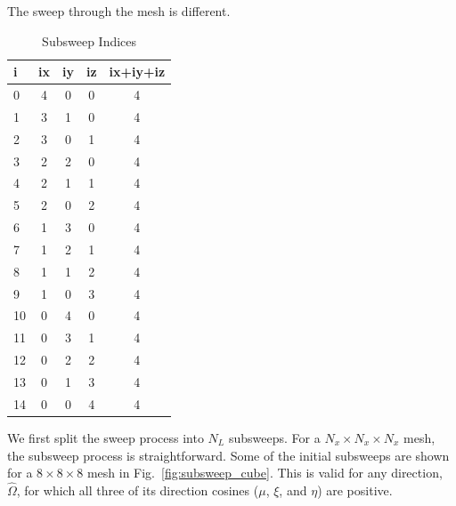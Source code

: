 The sweep through the mesh is different.

\begin{table}[ht]
\caption{Subsweep Indices}
\centering 
\begin{tabular}{l | c | c | c | c}
  \hline \hline   
  i  & ix & iy & iz & ix+iy+iz \\ [0.5ex] %
  \hline
  0  & 4 & 0 & 0 & 4\\
  1  & 3 & 1 & 0 & 4\\
  2  & 3 & 0 & 1 & 4\\
  3  & 2 & 2 & 0 & 4\\
  4  & 2 & 1 & 1 & 4\\
  5  & 2 & 0 & 2 & 4\\
  6  & 1 & 3 & 0 & 4\\
  7  & 1 & 2 & 1 & 4\\
  8  & 1 & 1 & 2 & 4\\
  9  & 1 & 0 & 3 & 4\\
  10 & 0 & 4 & 0 & 4\\
  11 & 0 & 3 & 1 & 4\\
  12 & 0 & 2 & 2 & 4\\
  13 & 0 & 1 & 3 & 4\\
  14 & 0 & 0 & 4 & 4\\ [1ex]      %
  \hline
\end{tabular}
\label{table:subsweep}
\end{table}

We first split the sweep process into $N_L$ subsweeps. For a $N_x \times N_x \times N_x$ mesh, the subsweep process is straightforward. Some of the initial subsweeps are shown for a $8 \times 8 \times 8$ mesh in Fig.~\ref{fig:subsweep_cube}. This is valid for any direction, $\hat{\Omega}$, for which all three of its direction cosines ($\mu$, $\xi$, and $\eta$) are positive.

